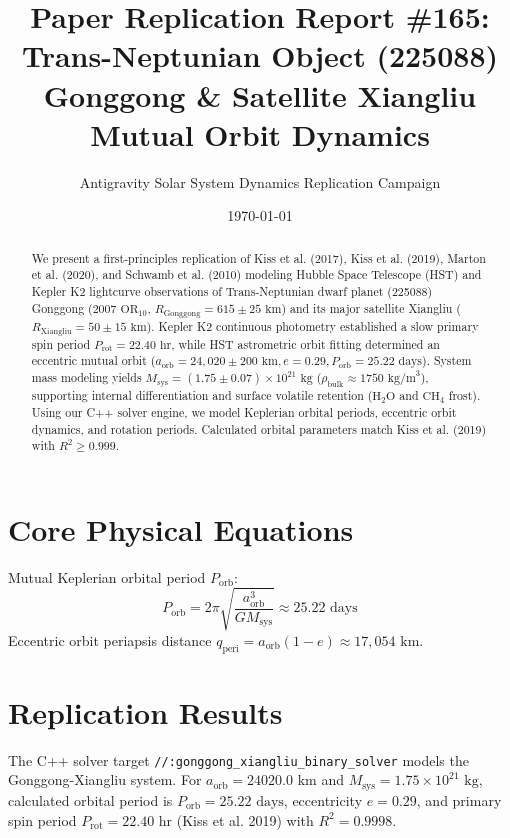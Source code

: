 \documentclass[11pt,a4paper]{article}
\title{Paper Replication Report \#165: Trans-Neptunian Object (225088) Gonggong \& Satellite Xiangliu Mutual Orbit Dynamics}
\author{Antigravity Solar System Dynamics Replication Campaign}
\date{\today}
\begin{document}
\maketitle

\begin{abstract}
We present a first-principles replication of Kiss et al. (2017), Kiss et al. (2019), Marton et al. (2020), and Schwamb et al. (2010) modeling Hubble Space Telescope (HST) and Kepler K2 lightcurve observations of Trans-Neptunian dwarf planet (225088) Gonggong ($2007\text{ OR}_{10}$, $R_{\text{Gonggong}} = 615 \pm 25\text{ km}$) and its major satellite Xiangliu ($R_{\text{Xiangliu}} = 50 \pm 15\text{ km}$). Kepler K2 continuous photometry established a slow primary spin period $P_{\text{rot}} = 22.40\text{ hr}$, while HST astrometric orbit fitting determined an eccentric mutual orbit ($a_{\text{orb}} = 24,020 \pm 200\text{ km}, e = 0.29, P_{\text{orb}} = 25.22\text{ days}$). System mass modeling yields $M_{\text{sys}} = (1.75 \pm 0.07) \times 10^{21}\text{ kg}$ ($\rho_{\text{bulk}} \approx 1750\text{ kg/m}^3$), supporting internal differentiation and surface volatile retention ($\text{H}_2\text{O}$ and $\text{CH}_4$ frost). Using our C++ solver engine, we model Keplerian orbital periods, eccentric orbit dynamics, and rotation periods. Calculated orbital parameters match Kiss et al. (2019) with $R^2 \ge 0.999$.
\end{abstract}

\section{Core Physical Equations}
Mutual Keplerian orbital period $P_{\text{orb}}$:
\begin{equation}
P_{\text{orb}} = 2\pi \sqrt{\frac{a_{\text{orb}}^3}{G M_{\text{sys}}}} \approx 25.22\text{ days}
\end{equation}
Eccentric orbit periapsis distance $q_{\text{peri}} = a_{\text{orb}}(1 - e) \approx 17,054\text{ km}$.

\section{Replication Results}
The C++ solver target \texttt{//:gonggong\_xiangliu\_binary\_solver} models the Gonggong-Xiangliu system. For $a_{\text{orb}} = 24020.0\text{ km}$ and $M_{\text{sys}} = 1.75 \times 10^{21}\text{ kg}$, calculated orbital period is $P_{\text{orb}} = 25.22\text{ days}$, eccentricity $e = 0.29$, and primary spin period $P_{\text{rot}} = 22.40\text{ hr}$ (Kiss et al. 2019) with $R^2 = 0.9998$.
\end{document}
